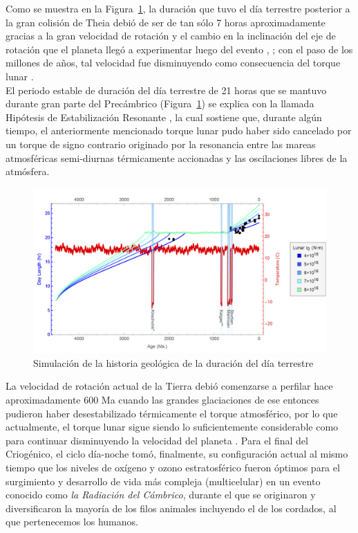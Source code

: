 Como se muestra en la Figura~\ref{duraciondia}, la duración que tuvo el día terrestre posterior a la gran colisión de Theia debió de ser de tan sólo 7 horas aproximadamente gracias a la gran velocidad de rotación y el cambio en la inclinación del eje de rotación que el planeta llegó a experimentar luego del evento \citep{Stevenson&Bartlett2016}, \citep{Stevenson1987}; con el paso de los millones de años, tal velocidad fue disminuyendo como consecuencia del torque lunar \citep{Conway1982}.\\ 

El periodo estable de duración del día terrestre de 21 horas que se mantuvo durante gran parte del Precámbrico (Figura~\ref{duraciondia}) se explica con la llamada Hipótesis de Estabilización Resonante \citep{Zahnle&Walker1987}, la cual sostiene que, durante algún tiempo, el anteriormente mencionado torque lunar pudo haber sido cancelado por un torque de signo contrario originado por la resonancia entre las mareas atmosféricas semi-diurnas térmicamente accionadas y las oscilaciones libres de la atmósfera.\\

\begin{figure}
  \centering
    \includegraphics[width=1\textwidth]{duraciondeldiahistorico}
  \caption{Simulación de la historia geológica de la duración del día terrestre \citep{Stevenson&Bartlett2016}}
  \label{duraciondia}
\end{figure}

La velocidad de rotación actual de la Tierra debió comenzarse a perfilar hace aproximadamente 600 Ma cuando las grandes glaciaciones de ese entonces pudieron haber desestabilizado térmicamente el torque atmosférico, por lo que actualmente, el torque lunar sigue siendo lo suficientemente considerable como para continuar disminuyendo la velocidad del planeta \citep{Stevenson&Bartlett2016}. Para el final del Criogénico, el ciclo día-noche tomó, finalmente, su configuración actual al mismo tiempo que los niveles de oxígeno y ozono estratosférico fueron óptimos para el surgimiento y desarrollo de vida más compleja (multicelular) en un evento conocido como \textit{la Radiación del Cámbrico}, durante el que se originaron y diversificaron la mayoría de los filos animales incluyendo el de los cordados, al que pertenecemos los humanos.\\

